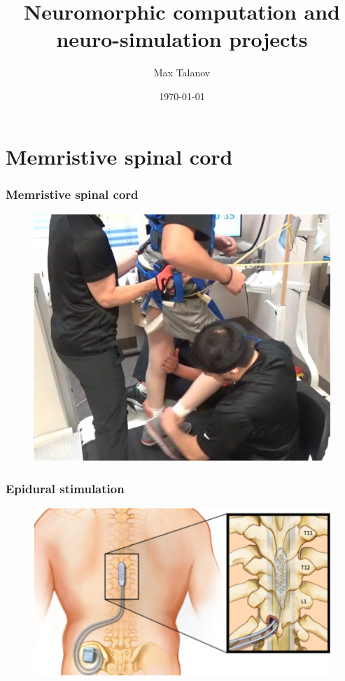 \documentclass[12pt, aspectratio=169]{beamer}
\title[Neuromorphic computation and neuro-simulation projects]{Neuromorphic computation and neuro-simulation projects} %
\author[Max Talanov]{
  Max Talanov
}
\institute[Neurobiology laboratory, ITIS: KFU]%
{
ITIS/Neurobiology laboratory, KFU \\ %
\medskip
\textit{max.talanov@gmail.com} %
}
\date{\today} %
\begin{document}
\begin{frame}
\titlepage %
\end{frame}


\section{Memristive spinal cord}
\begin{frame}
  \frametitle{Memristive spinal cord}
  \begin{figure}
    \includegraphics[width=0.5\linewidth]{neurorehabilitation}
  \end{figure}
\end{frame}
\begin{frame}
  \frametitle{Epidural stimulation}
  \begin{figure}
    \includegraphics[width=0.6\linewidth]{epidural_stimulation_spinal_cord}
  \end{figure}
\end{frame}
\end{document}
